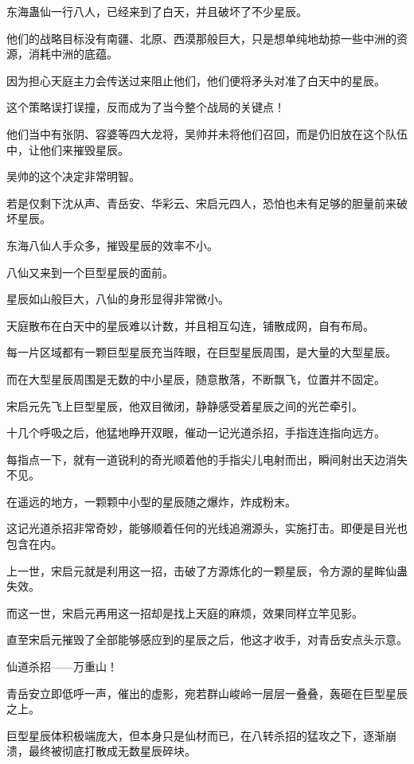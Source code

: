
\begin{this_body}

东海蛊仙一行八人，已经来到了白天，并且破坏了不少星辰。

他们的战略目标没有南疆、北原、西漠那般巨大，只是想单纯地劫掠一些中洲的资源，消耗中洲的底蕴。

因为担心天庭主力会传送过来阻止他们，他们便将矛头对准了白天中的星辰。

这个策略误打误撞，反而成为了当今整个战局的关键点！

他们当中有张阴、容婆等四大龙将，吴帅并未将他们召回，而是仍旧放在这个队伍中，让他们来摧毁星辰。

吴帅的这个决定非常明智。

若是仅剩下沈从声、青岳安、华彩云、宋启元四人，恐怕也未有足够的胆量前来破坏星辰。

东海八仙人手众多，摧毁星辰的效率不小。

八仙又来到一个巨型星辰的面前。

星辰如山般巨大，八仙的身形显得非常微小。

天庭散布在白天中的星辰难以计数，并且相互勾连，铺散成网，自有布局。

每一片区域都有一颗巨型星辰充当阵眼，在巨型星辰周围，是大量的大型星辰。

而在大型星辰周围是无数的中小星辰，随意散落，不断飘飞，位置并不固定。

宋启元先飞上巨型星辰，他双目微闭，静静感受着星辰之间的光芒牵引。

十几个呼吸之后，他猛地睁开双眼，催动一记光道杀招，手指连连指向远方。

每指点一下，就有一道锐利的奇光顺着他的手指尖儿电射而出，瞬间射出天边消失不见。

在遥远的地方，一颗颗中小型的星辰随之爆炸，炸成粉末。

这记光道杀招非常奇妙，能够顺着任何的光线追溯源头，实施打击。即便是目光也包含在内。

上一世，宋启元就是利用这一招，击破了方源炼化的一颗星辰，令方源的星眸仙蛊失效。

而这一世，宋启元再用这一招却是找上天庭的麻烦，效果同样立竿见影。

直至宋启元摧毁了全部能够感应到的星辰之后，他这才收手，对青岳安点头示意。

仙道杀招——万重山！

青岳安立即低呼一声，催出的虚影，宛若群山峻岭一层层一叠叠，轰砸在巨型星辰之上。

巨型星辰体积极端庞大，但本身只是仙材而已，在八转杀招的猛攻之下，逐渐崩溃，最终被彻底打散成无数星辰碎块。


\end{this_body}
